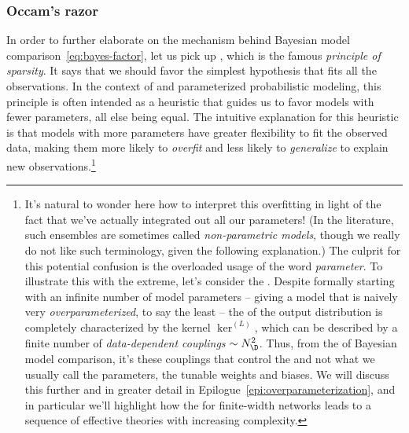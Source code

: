 \subsubsection{Occam's razor}
In order to further elaborate on the mechanism behind Bayesian model comparison~\eqref{eq:bayes-factor}, let us pick up  \cite{occam},
which is the famous \emph{principle of sparsity}. It says that we should favor the simplest hypothesis that fits all the observations. In the context of  and parameterized probabilistic modeling, this principle is often intended as a heuristic that guides us to favor models with fewer parameters, all else being equal. The intuitive explanation for this heuristic is that models with more parameters have greater flexibility to fit the observed data, making them more likely to \emph{overfit} and less likely to \emph{generalize} to explain new observations.\footnote{It's natural to wonder here how to interpret this overfitting in light of the fact that we've actually integrated out all our parameters! (In the  literature, such ensembles are sometimes called \emph{non-parametric models}, though we really do not like such terminology, given the following explanation.) The culprit for this potential confusion is the overloaded usage of the word \emph{parameter}.
To illustrate this with the extreme, let's consider the .
Despite formally starting with an infinite number of model parameters 
-- giving a model that is naively very \emph{overparameterized}, to say the least -- 
the  of the output distribution is completely characterized by the kernel $\ker^{(L)}$, which can be described by a finite number of \emph{data-dependent couplings} $\sim N_{\D}^2$. 
Thus, from the  of Bayesian model comparison, it's these couplings that control the  and not what we usually call the parameters, the tunable weights and biases. We will discuss this further and in greater detail in Epilogue~\ref{epi:overparameterization}, and in particular we'll highlight how the  for finite-width networks leads to a sequence of effective theories with increasing complexity.\label{footnote:occam-non-parametric}
}






